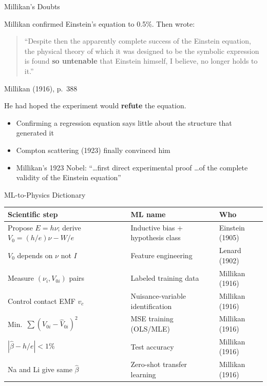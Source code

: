 \documentclass[aspectratio=169]{beamer}
\begin{document}
\begin{frame}{Millikan's Doubts}

Millikan confirmed Einstein's equation to 0.5\%. Then wrote:

\bigskip
\begin{quote}
``Despite then the apparently complete success of the Einstein equation,
the physical theory of which it was designed to be the symbolic expression
is found \textbf{so untenable} that Einstein himself, I believe, no longer
holds to it.''
\end{quote}
\hfill Millikan (1916), p.\ 388

\bigskip
He had hoped the experiment would \textbf{refute} the equation.

\medskip
\begin{itemize}
  \item Confirming a regression equation says little about the structure that generated it
  \item Compton scattering (1923) finally convinced him
  \item Millikan's 1923 Nobel: ``\ldots first direct experimental proof
    \ldots of the complete validity of the Einstein equation''
\end{itemize}

\end{frame}

\begin{frame}{ML-to-Physics Dictionary}

\begin{center}
\small
\begin{tabular}{p{5.0cm}p{4.8cm}p{2.6cm}}
\toprule
\textbf{Scientific step} & \textbf{ML name} & \textbf{Who} \\
\midrule
Propose $E = h\nu$; derive $V_0 = (h/e)\nu - W/e$
  & Inductive bias + hypothesis class & Einstein (1905) \\
$V_0$ depends on $\nu$ not $I$
  & Feature engineering & Lenard (1902) \\
Measure $(\nu_i, V_{0i})$ pairs
  & Labeled training data & Millikan (1916) \\
Control contact EMF $v_c$
  & Nuisance-variable identification & Millikan (1916) \\
Min.\ $\sum(V_{0i} - \hat V_{0i})^2$
  & MSE training (OLS/MLE) & Millikan (1916) \\
$|\hat\beta - h/e| < 1\%$
  & Test accuracy & Millikan (1916) \\
Na and Li give same $\hat\beta$
  & Zero-shot transfer learning & Millikan (1916) \\
\bottomrule
\end{tabular}
\end{center}

\end{frame}
\end{document}
